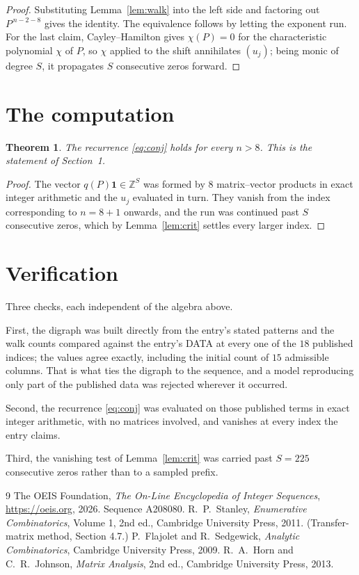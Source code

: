 \documentclass[11pt,a4paper]{article}
\theoremstyle{plain}
\newtheorem{theorem}{Theorem}
\theoremstyle{definition}
\begin{document}
\begin{proof}
Substituting Lemma~\ref{lem:walk} into the left side and factoring out
$P^{\,n-2-8}$ gives the identity. The equivalence follows by letting the exponent
run. For the last claim, Cayley--Hamilton gives $\chi(P)=0$ for the characteristic
polynomial $\chi$ of $P$, so $\chi$ applied to the shift annihilates $(u_j)$; being monic of
degree $S$, it propagates $S$ consecutive zeros forward.
\end{proof}

\section{The computation}

\begin{theorem}
The recurrence \eqref{eq:conj} holds for every $n>8$. This is the statement of
Section~1.
\end{theorem}

\begin{proof}
The vector $q(P)\mathbf{1}\in\mathbb{Z}^{S}$ was formed by $8$ matrix--vector
products in exact integer arithmetic and the $u_j$ evaluated in turn. They vanish from the
index corresponding to $n=8+1$ onwards, and the run was continued past $S$ consecutive
zeros, which by Lemma~\ref{lem:crit} settles every larger index.
\end{proof}

\section{Verification}

Three checks, each independent of the algebra above.

First, the digraph was built directly from the entry's stated patterns and the walk counts
compared against the entry's DATA at every one of the $18$ published indices; the
values agree exactly, including the initial count of $15$ admissible columns. That is
what ties the digraph to the sequence, and a model reproducing only part of the published
data was rejected wherever it occurred.

Second, the recurrence \eqref{eq:conj} was evaluated on those published terms in exact
integer arithmetic, with no matrices involved, and vanishes at every index the entry claims.

Third, the vanishing test of Lemma~\ref{lem:crit} was carried past $S=225$ consecutive
zeros rather than to a sampled prefix.

\begin{thebibliography}{9}
 The OEIS Foundation, \emph{The On-Line Encyclopedia of Integer
Sequences}, \url{https://oeis.org}, 2026. Sequence A208080.
 R.~P.~Stanley, \emph{Enumerative Combinatorics}, Volume 1, 2nd ed.,
Cambridge University Press, 2011. (Transfer-matrix method, Section 4.7.)
 P.~Flajolet and R.~Sedgewick, \emph{Analytic Combinatorics}, Cambridge
University Press, 2009.
 R.~A.~Horn and C.~R.~Johnson, \emph{Matrix Analysis}, 2nd ed., Cambridge
University Press, 2013.
\end{thebibliography}
\end{document}
